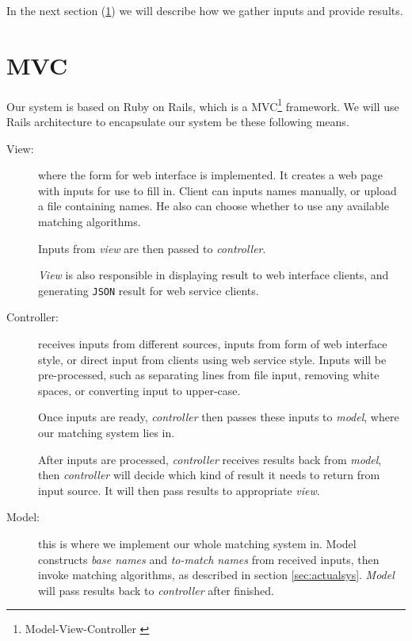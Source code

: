 In the next section (\ref{sec:mvc}) we will describe how we
gather inputs and provide results.

\section{MVC}
\label{sec:mvc}

Our system is based on Ruby on Rails, which is a MVC\footnote{Model-View-Controller
\cite[]{mvc}} framework. We will use Rails architecture to encapsulate
our system be these following means.

\begin{description}
  \item[View:] where the form for web interface is implemented.
    It creates a web page with inputs for use to fill in.
    Client can inputs names manually, or upload a file
    containing names. He also can choose whether to use any
    available matching algorithms.

    Inputs from \emph{view} are then passed to \emph{controller}.

    \emph{View} is also responsible in displaying result to
    web interface clients, and generating \texttt{JSON} result
    for web service clients.
  \item[Controller:] receives inputs from different sources,
    inputs from form of web interface style, or direct input from clients
    using web service style. Inputs will be pre-processed, such as
    separating lines from file input, removing white spaces,
    or converting input to upper-case.

    Once inputs are ready, \emph{controller} then passes these inputs
    to \emph{model}, where our matching system lies in.

    After inputs are processed, \emph{controller} receives results
    back from \emph{model}, then \emph{controller} will decide
    which kind of result it needs to return from input source.
    It will then pass results to appropriate \emph{view}.
  \item[Model:] this is where we implement our whole matching system in.
    Model constructs \emph{base names} and \emph{to-match names}
    from received inputs, then invoke matching algorithms, as described
    in section \ref{sec:actualsys}. \emph{Model} will pass results back to
    \emph{controller} after finished.
\end{description}

